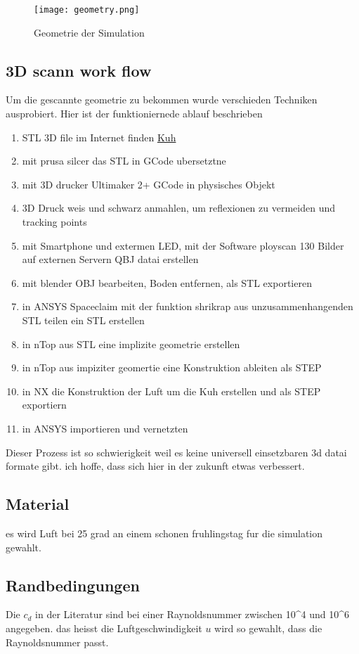 \documentclass[a4paper,12pt]{article}
\begin{document}
\begin{figure}[h]
    \centering
    \texttt{[image: geometry.png]}
    \caption{Geometrie der Simulation}
    \label{fig:geometry}
\end{figure}

\subsection{3D scann work flow}
Um die gescannte geometrie zu bekommen wurde verschieden Techniken ausprobiert. Hier ist der funktioniernede  ablauf beschrieben
\begin{enumerate}
\item STL 3D file im Internet finden \href{https://www.printables.com/de/model/175429-cow}{Kuh}
\item mit prusa silcer das STL in GCode ubersetztne
\item mit 3D drucker Ultimaker 2+ GCode in physisches Objekt
\item 3D Druck weis und schwarz anmahlen, um reflexionen zu vermeiden und tracking points
\item mit Smartphone und extermen LED, mit der Software ployscan 130 Bilder  auf externen Servern QBJ datai erstellen
\item mit blender OBJ bearbeiten, Boden entfernen, als STL exportieren
\item in ANSYS Spaceclaim mit der funktion shrikrap aus unzusammenhangenden STL teilen ein STL erstellen
\item in nTop aus STL eine implizite geometrie erstellen
\item in nTop aus impiziter geomertie eine Konstruktion ableiten als STEP
\item in NX die Konstruktion der Luft um die Kuh erstellen und als STEP exportiern
\item in ANSYS importieren und vernetzten  
  \end{enumerate}
Dieser Prozess ist so schwierigkeit weil es keine universell einsetzbaren 3d datai formate gibt. ich hoffe, dass sich hier in der zukunft etwas verbessert.

\subsection{Material}
es wird Luft bei 25 grad an einem schonen fruhlingstag fur die simulation gewahlt.

\subsection{Randbedingungen}
Die  \( c_d \) in der Literatur sind bei einer Raynoldsnummer zwischen  10^4 und 10^6 angegeben. das heisst die Luftgeschwindigkeit  \( u \) wird so gewahlt, dass die Raynoldsnummer passt.
\end{document}
